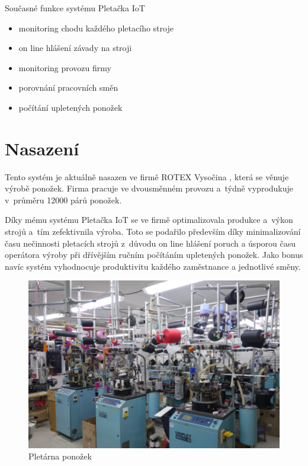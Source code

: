Současné funkce systému Pletačka IoT
\begin{itemize}
    \item monitoring chodu každého pletacího stroje
    \item on line hlášení závady na stroji
    \item monitoring provozu firmy
    \item porovnání pracovních směn
    \item počítání upletených ponožek
\end{itemize}



\section{Nasazení}
Tento systém je aktuálně nasazen ve firmě ROTEX Vysočina \cite{ROTEX}, která se věnuje výrobě ponožek. 
Firma pracuje ve dvousměnném provozu a~týdně vyprodukuje v~průměru 12000 párů ponožek. 

Díky mému systému Pletačka IoT se ve firmě optimalizovala produkce a výkon strojů a tím zefektivnila výroba. 
Toto se podařilo především díky minimalizování času nečinnosti pletacích strojů z důvodu on line hlášení poruch a úsporou času operátora výroby při dřívějším ručním počítáním upletených ponožek. 
Jako bonus navíc systém vyhodnocuje produktivitu každého zaměstnance a jednotlivé směny.

\begin{figure}[htbp]
    \centering
    \includegraphics[width=\textwidth]{img/pletarna.png}
    \caption{Pletárna ponožek}
    \label{fig:Pletarna}
\end{figure}



\newpage